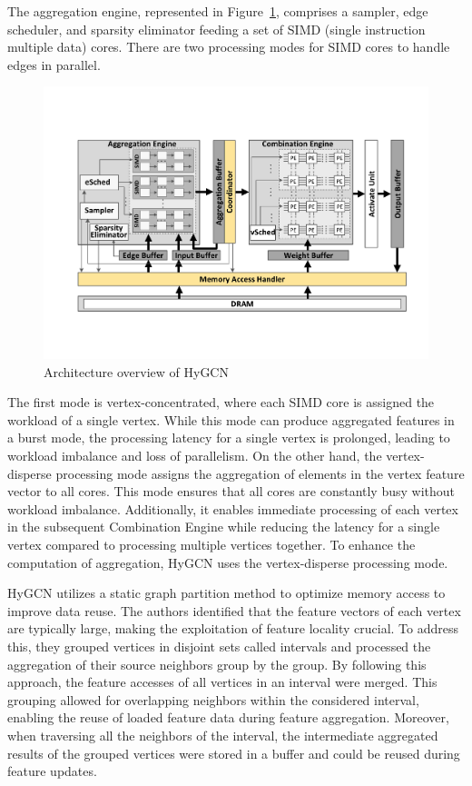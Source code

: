 The aggregation engine, represented in Figure~\ref{fig:hygcn_architecture}, comprises a sampler, edge scheduler, and sparsity eliminator feeding a set of SIMD (single instruction multiple data) cores.
There are two processing modes for SIMD cores to handle edges in parallel.

\begin{figure}[t]
    \centering
    \includegraphics[height=0.3\textwidth]{Images/HyGCN_architecture}
    \caption{Architecture overview of HyGCN~\cite{DBLP:journals/corr/abs-2001-02514}}
    \label{fig:hygcn_architecture}
\end{figure}

The first mode is vertex-concentrated, where each SIMD core is assigned the workload of a single vertex.
While this mode can produce aggregated features in a burst mode, the processing latency for a single vertex is prolonged, leading to workload imbalance and loss of parallelism.
On the other hand, the vertex-disperse processing mode assigns the aggregation of elements in the vertex feature vector to all cores.
This mode ensures that all cores are constantly busy without workload imbalance.
Additionally, it enables immediate processing of each vertex in the subsequent Combination Engine while reducing the latency for a single vertex compared to processing multiple vertices together.
To enhance the computation of aggregation, HyGCN uses the vertex-disperse processing mode.

HyGCN utilizes a static graph partition method to optimize memory access to improve data reuse.
The authors identified that the feature vectors of each vertex are typically large, making the exploitation of feature locality crucial.
To address this, they grouped vertices in disjoint sets called intervals and processed the aggregation of their source neighbors group by the group.
By following this approach, the feature accesses of all vertices in an interval were merged.
This grouping allowed for overlapping neighbors within the considered interval, enabling the reuse of loaded feature data during feature aggregation.
Moreover, when traversing all the neighbors of the interval, the intermediate aggregated results of the grouped vertices were stored in a buffer and could be reused during feature updates.


